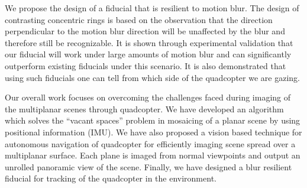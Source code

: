 We propose the design of a fiducial that is resilient to motion blur. The
design of contrasting concentric rings is based on the observation that the
direction perpendicular to the motion blur direction will be unaffected by the
blur and therefore still be recognizable. It is shown through experimental
validation that our fiducial will work under large amounts of motion blur and
can significantly outperform existing fiducials under this scenario. It is also
demonstrated that using such fiducials one can tell from which side of the
quadcopter we are gazing.

Our overall work focuses on overcoming the challenges faced during imaging of
the multiplanar scenes through quadcopter. We have developed an algorithm which
solves the ``vacant spaces'' problem in mosaicing of a planar scene by using
positional information (IMU). We have also proposed a vision based technique for
autonomous navigation of quadcopter for efficiently imaging scene spread over a
multiplanar surface. Each plane is imaged from normal viewpoints and output an
unrolled panoramic view of the scene. Finally, we have designed a blur resilient
fiducial for tracking of the quadcopter in the environment.        